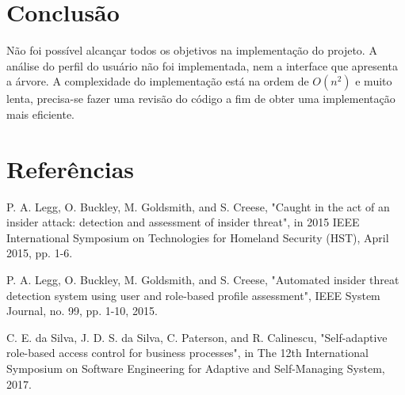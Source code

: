 \documentclass[12pt]{article}
\begin{document}
\section{Conclusão}\label{sec:figs}


Não foi possível alcançar todos os objetivos na implementação do projeto. A análise do perfil do usuário não foi implementada, nem a interface que apresenta a árvore. 
A complexidade do implementação está na ordem de $O(n^2)$ e muito lenta, precisa-se fazer uma revisão do código a fim de obter uma implementação mais eficiente.

\section{Referências}
\begin{flushleft}
P. A. Legg, O. Buckley, M. Goldsmith, and S. Creese, "Caught in the act of an insider attack: detection and assessment of insider threat", in 2015 IEEE International Symposium on Technologies for Homeland Security (HST), April 2015, pp. 1-6. 
\end{flushleft}

\begin{flushleft}
P. A. Legg, O. Buckley, M. Goldsmith, and S. Creese, "Automated insider threat detection system using user and role-based profile assessment", IEEE System Journal, no. 99, pp. 1-10, 2015. 
\end{flushleft}

\begin{flushleft}
C. E. da Silva, J. D. S. da Silva, C. Paterson, and R. Calinescu, "Self-adaptive role-based access control for business processes", in The 12th International Symposium on Software Engineering for Adaptive and Self-Managing System, 2017. 
\end{flushleft}
\end{document}
